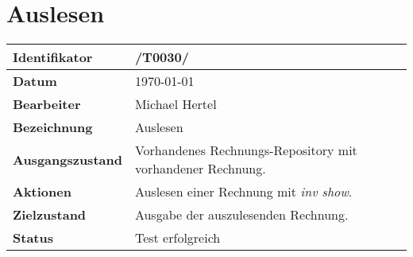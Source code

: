 
\section{Auslesen}

\renewcommand{\arraystretch}{1.5}

\begin{center}
 \begin{tabular}{|p{}|p{}|}
	\hline
	\textbf{Identifikator}  & /T0030/ \\
	\hline
	\textbf{Datum} & \today \\
	\hline
	\textbf{Bearbeiter} & Michael Hertel \\
	\hline
	\textbf{Bezeichnung} & Auslesen \\
	\hline
	\textbf{Ausgangszustand} & 
		Vorhandenes Rechnungs-Repository mit vorhandener Rechnung. \\
	\hline
	\textbf{Aktionen} & 
		Auslesen einer Rechnung mit \textit{inv show}. \\
	\hline
	\textbf{Zielzustand} & 
		Ausgabe der auszulesenden Rechnung. \\
	\hline
	\textbf{Status} & Test erfolgreich \\
	\hline
 \end{tabular}
\end{center}
